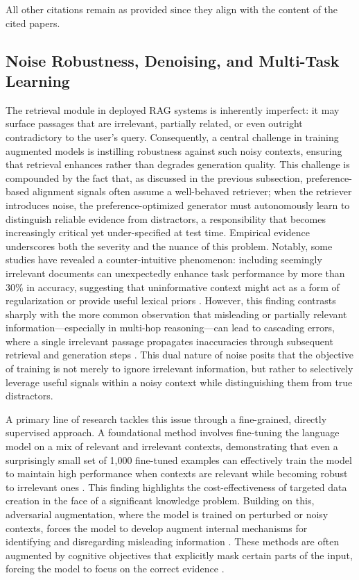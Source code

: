 \documentclass[11pt,a4paper]{article}
\begin{document}
All other citations remain as provided since they align with the content of the cited papers.


\subsection{Noise Robustness, Denoising, and Multi-Task Learning}


The retrieval module in deployed RAG systems is inherently imperfect: it may surface passages that are irrelevant, partially related, or even outright contradictory to the user's query. Consequently, a central challenge in training augmented models is instilling robustness against such noisy contexts, ensuring that retrieval enhances rather than degrades generation quality. This challenge is compounded by the fact that, as discussed in the previous subsection, preference-based alignment signals often assume a well-behaved retriever; when the retriever introduces noise, the preference-optimized generator must autonomously learn to distinguish reliable evidence from distractors, a responsibility that becomes increasingly critical yet under-specified at test time. Empirical evidence underscores both the severity and the nuance of this problem. Notably, some studies have revealed a counter-intuitive phenomenon: including seemingly irrelevant documents can unexpectedly enhance task performance by more than 30\% in accuracy, suggesting that uninformative context might act as a form of regularization or provide useful lexical priors \cite{arxiv:2401.14887v3}. However, this finding contrasts sharply with the more common observation that misleading or partially relevant information---especially in multi-hop reasoning---can lead to cascading errors, where a single irrelevant passage propagates inaccuracies through subsequent retrieval and generation steps \cite{arxiv:2310.01558v1,arxiv:2212.10509v2}. This dual nature of noise posits that the objective of training is not merely to ignore irrelevant information, but rather to selectively leverage useful signals within a noisy context while distinguishing them from true distractors.

A primary line of research tackles this issue through a fine-grained, directly supervised approach. A foundational method involves fine-tuning the language model on a mix of relevant and irrelevant contexts, demonstrating that even a surprisingly small set of 1,000 fine-tuned examples can effectively train the model to maintain high performance when contexts are relevant while becoming robust to irrelevant ones \cite{arxiv:2310.01558v1}. This finding highlights the cost-effectiveness of targeted data creation in the face of a significant knowledge problem. Building on this, adversarial augmentation, where the model is trained on perturbed or noisy contexts, forces the model to develop augment internal mechanisms for identifying and disregarding misleading information \cite{arxiv:2312.10997v5,arxiv:2402.13547v1}. These methods are often augmented by cognitive objectives that explicitly mask certain parts of the input, forcing the model to focus on the correct evidence \cite{arxiv:2402.13547v1}.
\end{document}
